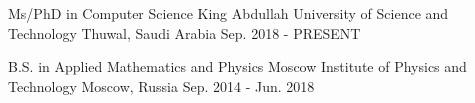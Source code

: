 


\begin{cventries}


\cventry
{Ms/PhD in Computer Science } %
{King Abdullah University of Science and Technology} %
{Thuwal, Saudi Arabia} %
{Sep. 2018 - PRESENT} %
{
}

\cventry
{B.S. in Applied Mathematics and Physics} %
{Moscow Institute of Physics and Technology} %
{Moscow, Russia} %
{Sep. 2014 - Jun. 2018} %
{ %
}


\end{cventries}